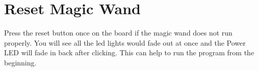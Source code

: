 \section{Reset Magic Wand}\label{Reset Magic Wand}
Press the reset button once on the board if the magic wand does not run properly. You will see all the led lights would fade out at once and the Power LED will fade in back after clicking. This can help to run the program from the beginning.



